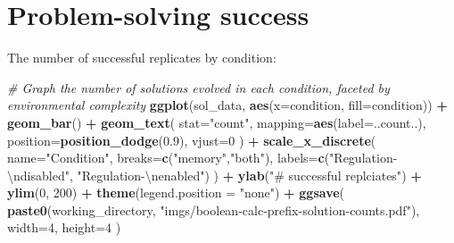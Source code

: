 \documentclass[
]{book}
\newenvironment{Shaded}{\begin{snugshade}}{\end{snugshade}}
\newcommand{\CharTok}[1]{\textcolor[rgb]{0.31,0.60,0.02}{#1}}
\newcommand{\CommentTok}[1]{\textcolor[rgb]{0.56,0.35,0.01}{\textit{#1}}}
\newcommand{\DataTypeTok}[1]{\textcolor[rgb]{0.13,0.29,0.53}{#1}}
\newcommand{\DecValTok}[1]{\textcolor[rgb]{0.00,0.00,0.81}{#1}}
\newcommand{\FloatTok}[1]{\textcolor[rgb]{0.00,0.00,0.81}{#1}}
\newcommand{\KeywordTok}[1]{\textcolor[rgb]{0.13,0.29,0.53}{\textbf{#1}}}
\newcommand{\NormalTok}[1]{#1}
\newcommand{\OperatorTok}[1]{\textcolor[rgb]{0.81,0.36,0.00}{\textbf{#1}}}
\newcommand{\StringTok}[1]{\textcolor[rgb]{0.31,0.60,0.02}{#1}}
\begin{document}
\begin{Shaded}
\end{Shaded}

\hypertarget{problem-solving-success-2}{%
\section{Problem-solving success}\label{problem-solving-success-2}}

The number of successful replicates by condition:

\begin{Shaded}
\begin{Highlighting}[]
\CommentTok{\# Graph the number of solutions evolved in each condition, faceted by environmental complexity}
\KeywordTok{ggplot}\NormalTok{(sol\_data, }\KeywordTok{aes}\NormalTok{(}\DataTypeTok{x=}\NormalTok{condition, }\DataTypeTok{fill=}\NormalTok{condition)) }\OperatorTok{+}
\StringTok{  }\KeywordTok{geom\_bar}\NormalTok{() }\OperatorTok{+}
\StringTok{  }\KeywordTok{geom\_text}\NormalTok{(}
    \DataTypeTok{stat=}\StringTok{"count"}\NormalTok{,}
    \DataTypeTok{mapping=}\KeywordTok{aes}\NormalTok{(}\DataTypeTok{label=}\NormalTok{..count..),}
    \DataTypeTok{position=}\KeywordTok{position\_dodge}\NormalTok{(}\FloatTok{0.9}\NormalTok{),}
    \DataTypeTok{vjust=}\DecValTok{0}
\NormalTok{  ) }\OperatorTok{+}
\StringTok{  }\KeywordTok{scale\_x\_discrete}\NormalTok{(}
    \DataTypeTok{name=}\StringTok{"Condition"}\NormalTok{,}
    \DataTypeTok{breaks=}\KeywordTok{c}\NormalTok{(}\StringTok{"memory"}\NormalTok{,}\StringTok{"both"}\NormalTok{),}
    \DataTypeTok{labels=}\KeywordTok{c}\NormalTok{(}\StringTok{"Regulation{-}}\CharTok{\textbackslash{}n}\StringTok{disabled"}\NormalTok{, }\StringTok{"Regulation{-}}\CharTok{\textbackslash{}n}\StringTok{enabled"}\NormalTok{)}
\NormalTok{  ) }\OperatorTok{+}
\StringTok{  }\KeywordTok{ylab}\NormalTok{(}\StringTok{"\# successful replciates"}\NormalTok{) }\OperatorTok{+}
\StringTok{  }\KeywordTok{ylim}\NormalTok{(}\DecValTok{0}\NormalTok{, }\DecValTok{200}\NormalTok{) }\OperatorTok{+}
\StringTok{  }\KeywordTok{theme}\NormalTok{(}\DataTypeTok{legend.position =} \StringTok{"none"}\NormalTok{) }\OperatorTok{+}
\StringTok{  }\KeywordTok{ggsave}\NormalTok{(}
    \KeywordTok{paste0}\NormalTok{(working\_directory, }\StringTok{"imgs/boolean{-}calc{-}prefix{-}solution{-}counts.pdf"}\NormalTok{),}
    \DataTypeTok{width=}\DecValTok{4}\NormalTok{,}
    \DataTypeTok{height=}\DecValTok{4}
\NormalTok{  )}
\end{Highlighting}
\end{Shaded}
\end{document}
